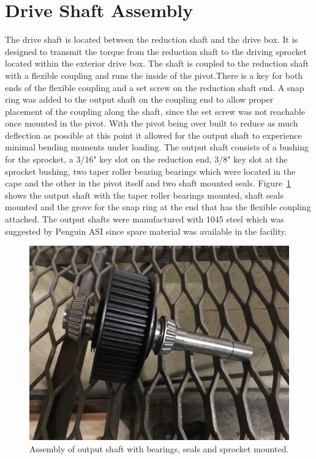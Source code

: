 \section{Drive Shaft Assembly}
The drive shaft is located between the reduction shaft and the drive box. It is designed to transmit the torque from the reduction shaft to the driving sprocket located within the exterior drive box. The shaft is coupled to the reduction shaft with a flexible coupling and runs the inside of the pivot.There is a key for both ends of the flexible coupling and a set screw on the reduction shaft end. A snap ring was added to the output shaft on the coupling end to allow proper placement of the coupling along the shaft, since the set screw was not reachable once mounted in the pivot. With the pivot being over built to reduce as much deflection as possible at this point it allowed for the output shaft to experience minimal bending moments under loading. The output shaft consists of a bushing for the sprocket, a 3/16" key slot on the reduction end, 3/8" key slot at the sprocket bushing, two taper roller bearing bearings which were located in the cape and the other in the pivot itself and two shaft mounted seals. Figure~\ref{fig:output_shaft} shows the output shaft with the taper roller bearings mounted, shaft seals mounted and the grove for the snap ring at the end that has the flexible coupling attached. The output shafts were manufactured with 1045 steel which was suggested by Penguin ASI since spare material was available in the facility.
\begin{figure}[htbp]
	\includegraphics[width=\linewidth]{images/drive_shaft_assembly_bld.jpg}
	\caption{Assembly of output shaft with bearings, seals and sprocket mounted.}
	\label{fig:output_shaft}
\end{figure}
